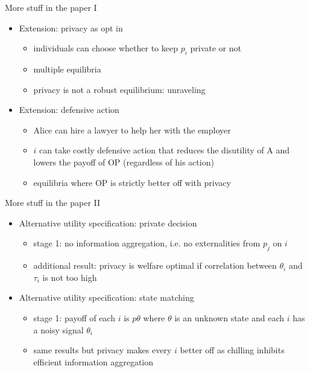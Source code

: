 \documentclass[bigger]{beamer}
\begin{document}
\begin{frame}[label={sec:orgheadline17}]{More stuff in the paper I}
\begin{itemize}
\item Extension: privacy as opt in
\begin{itemize}
\item individuals can choose whether to keep \(p_i\) private or not
\item multiple equilibria
\item privacy is not a robust equilibrium: unraveling
\end{itemize}
\item Extension: defensive action
\begin{itemize}
\item Alice can hire a lawyer to help her with the employer
\item \(i\) can take costly defensive action that reduces the disutility of A and lowers the payoff of OP (regardless of his action)
\item equilibria where OP is strictly better off with privacy
\end{itemize}
\end{itemize}
\end{frame}
\begin{frame}[label={sec:orgheadline18}]{More stuff in the paper II}
\begin{itemize}
\item Alternative utility specification: private decision
\begin{itemize}
\item stage 1: no information aggregation, i.e. no externalities from \(p_j\) on \(i\)
\item additional result: privacy is welfare optimal if correlation between \(\theta_i\) and \(\tau_i\) is not too high
\end{itemize}
\item Alternative utility specification: state matching
\begin{itemize}
\item stage 1: payoff of each \(i\) is \(p\theta\) where \(\theta\) is an unknown state and each \(i\) has a noisy signal \(\theta_i\)
\item same results but privacy makes every \(i\) better off as chilling inhibits efficient information aggregation
\end{itemize}
\end{itemize}
\end{frame}
\end{document}
